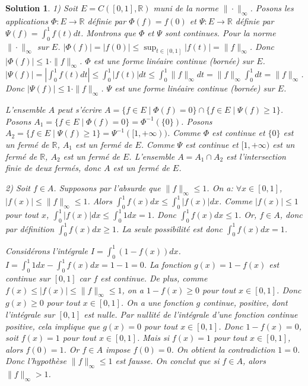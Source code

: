 \documentclass{article}
\newtheorem{solution}{Solution}
\begin{document}
\begin{solution}
1) Soit $E = C([0,1], \mathbb{R})$ muni de la norme $\| \cdot \|_\infty$.
Posons les applications $\Phi: E \to \mathbb{R}$ définie par $\Phi(f) = f(0)$ et $\Psi: E \to \mathbb{R}$ définie par $\Psi(f) = \int_0^1 f(t)dt$.
Montrons que $\Phi$ et $\Psi$ sont continues. Pour la norme $\| \cdot \|_\infty$ sur $E$.
$|\Phi(f)| = |f(0)| \le \sup_{t \in [0,1]} |f(t)| = \|f\|_\infty$.
Donc $|\Phi(f)| \le 1 \cdot \|f\|_\infty$. $\Phi$ est une forme linéaire continue (bornée) sur $E$.
$|\Psi(f)| = |\int_0^1 f(t)dt| \le \int_0^1 |f(t)| dt \le \int_0^1 \|f\|_\infty dt = \|f\|_\infty \int_0^1 dt = \|f\|_\infty$.
Donc $|\Psi(f)| \le 1 \cdot \|f\|_\infty$. $\Psi$ est une forme linéaire continue (bornée) sur $E$.

L'ensemble $A$ peut s'écrire $A = \{f \in E \mid \Phi(f) = 0\} \cap \{f \in E \mid \Psi(f) \ge 1\}$.
Posons $A_1 = \{f \in E \mid \Phi(f) = 0\} = \Phi^{-1}(\{0\})$.
Posons $A_2 = \{f \in E \mid \Psi(f) \ge 1\} = \Psi^{-1}([1, +\infty))$.
Comme $\Phi$ est continue et $\{0\}$ est un fermé de $\mathbb{R}$, $A_1$ est un fermé de $E$.
Comme $\Psi$ est continue et $[1, +\infty)$ est un fermé de $\mathbb{R}$, $A_2$ est un fermé de $E$.
L'ensemble $A = A_1 \cap A_2$ est l'intersection finie de deux fermés, donc $A$ est un fermé de $E$.

2) Soit $f \in A$. Supposons par l'absurde que $\|f\|_\infty \le 1$.
On a: $\forall x \in [0,1]$, $|f(x)| \le \|f\|_\infty \le 1$.
Alors $\int_0^1 f(x)dx \le \int_0^1 |f(x)|dx$.
Comme $|f(x)| \le 1$ pour tout $x$, $\int_0^1 |f(x)|dx \le \int_0^1 1 dx = 1$.
Donc $\int_0^1 f(x)dx \le 1$.
Or, $f \in A$, donc par définition $\int_0^1 f(x)dx \ge 1$.
La seule possibilité est donc $\int_0^1 f(x)dx = 1$.

Considérons l'intégrale $I = \int_0^1 (1 - f(x)) dx$.
$I = \int_0^1 1 dx - \int_0^1 f(x) dx = 1 - 1 = 0$.
La fonction $g(x) = 1 - f(x)$ est continue sur $[0,1]$ car $f$ est continue.
De plus, comme $f(x) \le |f(x)| \le \|f\|_\infty \le 1$, on a $1 - f(x) \ge 0$ pour tout $x \in [0,1]$.
Donc $g(x) \ge 0$ pour tout $x \in [0,1]$.
On a une fonction $g$ continue, positive, dont l'intégrale sur $[0,1]$ est nulle. Par nullité de l'intégrale d'une fonction continue positive, cela implique que $g(x) = 0$ pour tout $x \in [0,1]$.
Donc $1 - f(x) = 0$, soit $f(x) = 1$ pour tout $x \in [0,1]$.
Mais si $f(x) = 1$ pour tout $x \in [0,1]$, alors $f(0) = 1$.
Or $f \in A$ impose $f(0) = 0$. On obtient la contradiction $1 = 0$.
Donc l'hypothèse $\|f\|_\infty \le 1$ est fausse.
On conclut que si $f \in A$, alors $\|f\|_\infty > 1$.

\end{solution}
\end{document}
